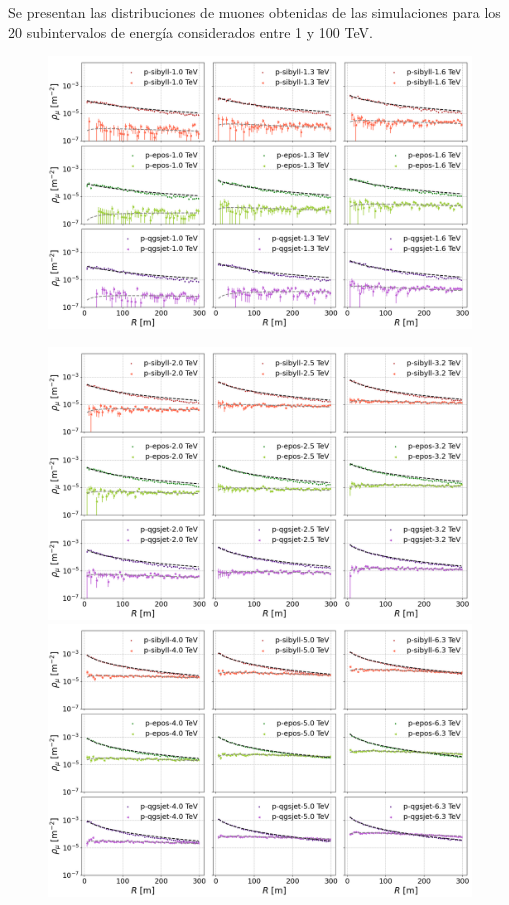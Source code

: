 
Se presentan las distribuciones de muones obtenidas de las simulaciones para los 20 subintervalos de energ\'ia considerados entre 1 y 100 TeV.

\begin{figure}[h]
	\includegraphics[width=\textwidth]{Figuras/lateraldist_wfits_1-3.png}
\end{figure}

\begin{figure}
	\includegraphics[width=\textwidth]{Figuras/lateraldist_wfits_4-6.png}
	\includegraphics[width=\textwidth]{Figuras/lateraldist_wfits_7-9.png}
\end{figure}

